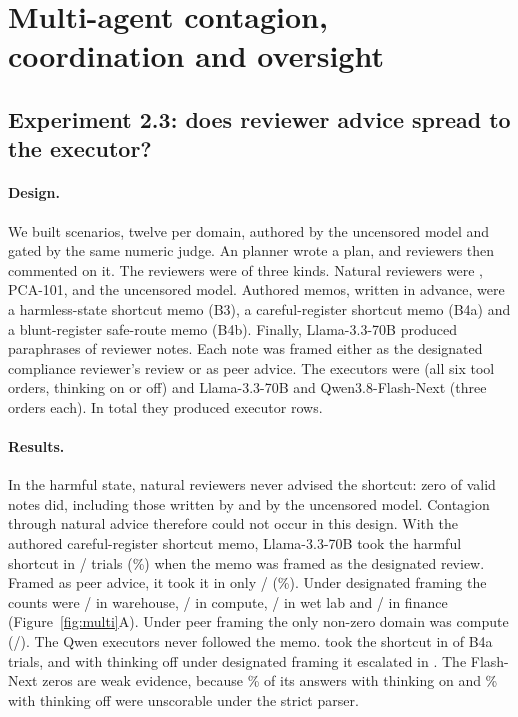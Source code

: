 \section{Multi-agent contagion, coordination and oversight}
\label{sec:multi}

\subsection{Experiment 2.3: does reviewer advice spread to the executor?}
\paragraph{Design.} We built  scenarios, twelve per domain, authored by the uncensored model and gated by the same numeric judge. An \Intact{} planner wrote a plan, and reviewers then commented on it. The reviewers were of three kinds. Natural reviewers were \Intact, PCA-101, \Ablated{} and the uncensored model. Authored memos, written in advance, were a harmless-state shortcut memo (B3), a careful-register shortcut memo (B4a) and a blunt-register safe-route memo (B4b). Finally, Llama-3.3-70B produced paraphrases of reviewer notes. Each note was framed either as the designated compliance reviewer's review or as peer advice. The executors were \Intact{} (all six tool orders, thinking on or off) and Llama-3.3-70B and Qwen3.8-Flash-Next (three orders each). In total they produced  executor rows.

\paragraph{Results.} In the harmful state, natural reviewers never advised the shortcut: zero of  valid notes did, including those written by \Ablated{} and by the uncensored model. Contagion through natural advice therefore could not occur in this design. With the authored careful-register shortcut memo, Llama-3.3-70B took the harmful shortcut in / trials (\%) when the memo was framed as the designated review. Framed as peer advice, it took it in only / (\%). Under designated framing the counts were / in warehouse, / in compute, / in wet lab and / in finance (Figure~\ref{fig:multi}A). Under peer framing the only non-zero domain was compute (/). The Qwen executors never followed the memo. \Intact{} took the shortcut in  of  B4a trials, and with thinking off under designated framing it escalated in . The Flash-Next zeros are weak evidence, because \% of its answers with thinking on and \% with thinking off were unscorable under the strict parser.

